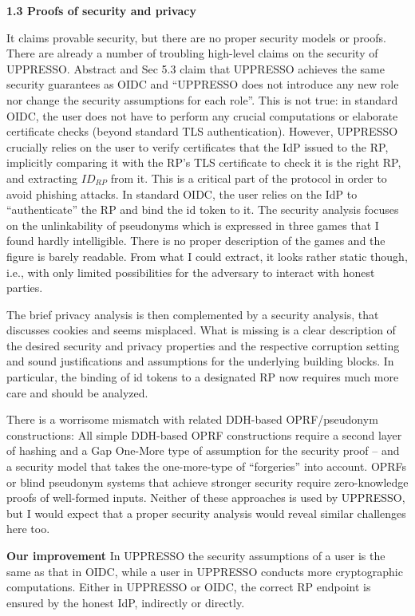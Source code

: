 \documentclass[letterpaper,onecolumn,10pt]{article}
\begin{document}
\vspace{1mm}\noindent\textbf{1.3 Proofs of security and privacy}

It claims provable security, but there are no proper security models or proofs.
There are already a number of troubling high-level claims on the security of UPPRESSO.
Abstract and Sec 5.3 claim that UPPRESSO achieves the same security guarantees as OIDC and ``UPPRESSO does not introduce any new role nor change the security assumptions for each role''.
This is not true: in standard OIDC, the user does not have to perform any crucial computations or elaborate certificate checks (beyond standard TLS authentication).
However, UPPRESSO crucially relies on the user to verify certificates that the IdP issued to the RP, implicitly comparing it with the RP's TLS certificate to check it is the right RP, and extracting $ID_{RP}$ from it.
This is a critical part of the protocol in order to avoid phishing attacks. In standard OIDC, the user relies on the IdP to ``authenticate'' the RP and bind the id token to it.
The security analysis focuses on the unlinkability of pseudonyms which is expressed in three games that I found hardly intelligible.
There is no proper description of the games and the figure is barely readable.
From what I could extract, it looks rather static though, i.e., with only limited possibilities for the adversary to interact with honest parties.

The brief privacy analysis is then complemented by a security analysis, that discusses cookies and seems misplaced.
What is missing is a clear description of the desired security and privacy properties and the respective corruption setting and sound justifications and assumptions for the underlying building blocks. In particular, the binding of id tokens to a designated RP now requires much more care and should be analyzed.

There is a worrisome mismatch with related DDH-based OPRF/pseudonym constructions:
All simple DDH-based OPRF constructions require a second layer of hashing and a Gap One-More type of assumption for the security proof -- and a security model that takes the one-more-type of ``forgeries'' into account.
OPRFs or blind pseudonym systems that achieve stronger security require zero-knowledge proofs of well-formed inputs. Neither of these approaches is used by UPPRESSO, but I would expect that a proper security analysis would reveal similar challenges here too.



\vspace{1mm}\noindent\textbf{Our improvement}
In UPPRESSO
    the security assumptions of a user is the same as that in OIDC,
        while a user in UPPRESSO conducts more cryptographic computations.
Either in UPPRESSO or OIDC,
    the correct RP endpoint is ensured by the honest IdP, indirectly or directly.
\end{document}
